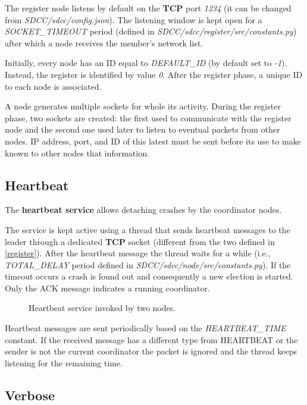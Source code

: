 \documentclass[conference]{IEEEtran}
\begin{document}
The register node listens by default on the \textbf{TCP} port \textit{1234} (it can be changed from \textit{SDCC/sdcc/config.json}). The listening window is kept open for a \textit{SOCKET\_TIMEOUT} period (defined in \textit{SDCC/sdcc/register/src/constants.py}) after which a node receives the member's network list. 

Initially, every node has an ID equal to \textit{DEFAULT\_ID} (by default set to \textit{-1}). Instead, the register is identified by value \textit{0}. After the register phase, a unique ID to each node is associated.

A node generates multiple sockets for whole its activity. During the register phase, two sockets are created: the first used to communicate with the register node and the second one used later to listen to eventual packets from other nodes. IP address, port, and ID of this latest must be sent before its use to make known to other nodes that information.

\subsection{Heartbeat}

The \textbf{heartbeat service} allows detaching crashes by the coordinator nodes. 

The service is kept active using a thread that sends heartbeat messages to the leader through a dedicated \textbf{TCP} socket (different from the two defined in \ref{register}). After the heartbeat message the thread waits for a while (i.e., \textit{TOTAL\_DELAY} period defined in \textit{SDCC/sdcc/node/src/constants.py}). If the timeout occurs a crash is found out and consequently a new election is started. Only the ACK message indicates a running coordinator.   

\begin{figure}[htbp]
  \centering
  
  \caption{Heartbeat service invoked by two nodes.}
\end{figure}
Heartbeat messages are sent periodically based on the \textit{HEARTBEAT\_TIME} constant. 
If the received message has a different type from HEARTBEAT or the sender is not the current coordinator the packet is ignored and the thread keeps listening for the remaining time. 

\subsection{Verbose}
\end{document}

